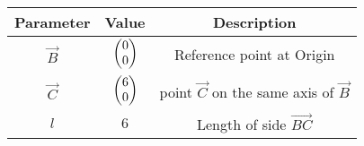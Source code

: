 \begin{tabular}{|c|c|c|}
\hline
\textbf{Parameter} & \textbf{Value} & \textbf{Description} \\
\hline
	$\vec{B}$ & $\begin{pmatrix}0\\0\end{pmatrix}$ & Reference point at Origin \\
\hline
	$\vec{C}$ & $\begin{pmatrix}6\\0\end{pmatrix}$ & point $\vec{C}$ on the same axis of $\vec{B}$ \\
\hline
    $l$ & $6$ & Length of side  $\vec{BC}$ \\
\hline
\end{tabular}
